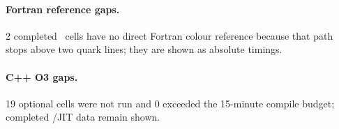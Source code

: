 \begin{landscape}
\paragraph{Fortran reference gaps.}
\noindent\scriptsize 2 completed \PAC\ cells have no direct Fortran colour reference because that path stops above two quark lines; they are shown as absolute timings.
\par\vspace{0.15em}
\paragraph{C++ O3 gaps.}
\noindent\scriptsize 19 optional cells were not run and 0 exceeded the 15-minute compile budget; completed \AC/JIT data remain shown.
\par\vspace{0.15em}
\end{landscape}
